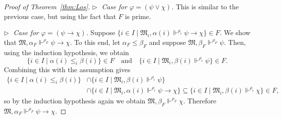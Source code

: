\documentclass[10pt,a4paper]{amsart}
\newcommand{\mo}{\mathfrak}
\newcommand{\satisfySym}{\Vdash}
\newcommand{\satisfy}[4]{#1, #2 \satisfySym^{#4} #3}
\renewcommand{\phi}{\varphi}
\begin{document}
\begin{proof}[Proof of Theorem~\ref{thm:Los}]
  \medskip\noindent
  \textit{$\triangleright\;$ Case for $\phi = (\psi \vee \chi)$.}
    This is similar to the previous case, but using the fact that $F$ is prime.

  \medskip\noindent
  \textit{$\triangleright\;$ Case for $\phi = (\psi \to \chi)$.}
    Suppose $\{ i \in I \mid \satisfy{\mo{M}_i}{\alpha(i)}{\psi \to \chi}{\rho_i} \} \in F$.
    We show that $\satisfy{\mo{M}}{\alpha_F}{\psi \to \chi}{\rho_F}$.
    To this end, let $\alpha_F \leq \beta_F$ and suppose
    $\satisfy{\mo{M}}{\beta_F}{\psi}{\rho_F}$.
    Then, using the induction hypothesis, we obtain
    \begin{equation*}
      \{ i \in I \mid \alpha(i) \leq_i \beta(i) \} \in F
      \quad\text{and}\quad
      \{ i \in I \mid \satisfy{\mo{M}_i}{\beta(i)}{\psi}{\rho_i} \} \in F.
    \end{equation*}
    Combining this with the assumption gives
    \begin{align*}
      \{ i \in I \mid \alpha(i) \leq_i \beta(i) \}
      &\cap \{ i \in I \mid \satisfy{\mo{M}_i}{\beta(i)}{\psi}{\rho_i} \} \\
      &\cap \{ i \in I \mid \satisfy{\mo{M}_i}{\alpha(i)}{\psi \to \chi}{\rho_i} \}
      \subseteq \{ i \in I \mid \satisfy{\mo{M}_i}{\beta(i)}{\chi}{\rho_i} \} \in F,
    \end{align*}
    so by the induction hypothesis again we obtain
    $\satisfy{\mo{M}}{\beta_F}{\chi}{\rho_F}$.
    Therefore $\satisfy{\mo{M}}{\alpha_F}{\psi \to \chi}{\rho_F}$.


\end{proof}
\end{document}
